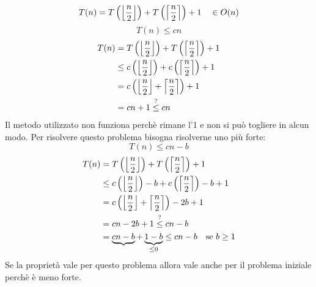 \documentclass[a4paper]{article}
\begin{document}
\begin{example}
  \[
    T(n) = T\left(\floor*{\frac{n}{2}}\right) + T\left(\ceil*{\frac{n}{2}}\right) + 1 \quad \in O(n)
  \] 
  \[
  T(n) \le cn
  \] 
  \[
  \begin{aligned}
    T(n) & = T\left(\floor*{\frac{n}{2}}\right) + T\left(\ceil*{\frac{n}{2}}\right) + 1\\
         & \le c\left(\floor*{\frac{n}{2}}\right) + c\left(\ceil*{\frac{n}{2}}\right) + 1\\
         & = c \left( \left\lfloor \frac{n}{2} \right\rfloor + \left\lceil \frac{n}{2} \right\rceil  \right) + 1\\
         & = cn + 1 \stackrel{?}{\le} cn
  \end{aligned}
  \] 
  Il metodo utilizzato non funziona perchè rimane l'1 e non si può togliere in alcun modo.
  Per risolvere questo problema bisogna risolverne uno più forte:
  \[
  T(n) \le cn - b
  \] 
  \[
  \begin{aligned}
    T(n) & = T\left(\floor*{\frac{n}{2}}\right) + T\left(\ceil*{\frac{n}{2}}\right) + 1\\
         & \le c\left(\floor*{\frac{n}{2}}\right) -b + c\left(\ceil*{\frac{n}{2}}\right) -b + 1\\
         & = c \left( \left\lfloor \frac{n}{2} \right\rfloor + \left\lceil \frac{n}{2} \right\rceil  \right) - 2b + 1\\
         & = cn - 2b + 1 \stackrel{?}{\le} cn - b\\
         & = \underbrace{cn - b} + \underbrace{1 - b}_{\le 0} \le cn - b \quad \text{se } b \ge 1\\
  \end{aligned}
  \] 
  Se la proprietà vale per questo problema allora vale anche per il problema iniziale
  perchè è meno forte.
\end{example}
\end{document}
